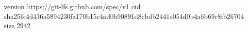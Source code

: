 version https://git-lfs.github.com/spec/v1
oid sha256:4d436a5894230fa170b15c4ad0b90891d8cbdb2441e054d0b4a6b69c8fb26704
size 2942
